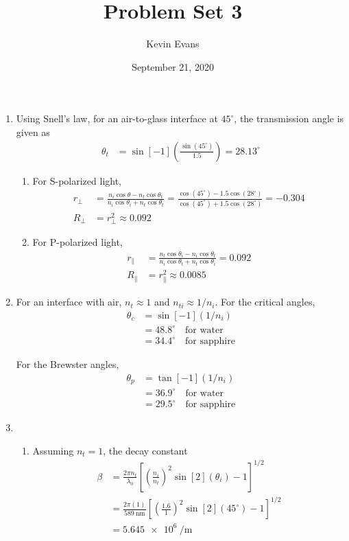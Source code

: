 \documentclass{homework}
\title{Problem Set 3}
\author{Kevin Evans}
\date{September 21, 2020}
\begin{document}
	\maketitle
	\begin{enumerate}
		\item Using Snell's law, for an air-to-glass interface at $45^\circ$, the transmission angle is given as \begin{align*}
			\theta_t & = \sin[-1](\frac{\sin(45^\circ)}{1.5}) = 28.13^\circ
		\end{align*} \begin{enumerate}
			\item For S-polarized light, \begin{align*}
				r_\perp & = \frac{n_i \cos \theta - n_t \cos \theta_t}{n_i \cos \theta_i + n_t \cos \theta_t} = \frac{\cos(45^\circ) - 1.5 \cos(28^\circ)}{\cos(45^\circ) + 1.5 \cos(28^\circ)} = -0.304 \\
				R_\perp & = r_\perp^2 \approx 0.092
			\end{align*}
			
			\item For P-polarized light, \begin{align*}
				r_\parallel & = \frac{n_t \cos \theta_i - n_i \cos \theta_t}{n_i \cos \theta_t + n_t \cos \theta_i} = 0.092 \\
				R_\parallel & = r_\parallel^2 \approx 0.0085
			\end{align*}
		\end{enumerate}
	
		\item For an interface with air, $n_t \approx 1$ and $n_{ti} \approx 1 / n_i$. For the critical angles, \begin{align*}
			\theta_c & = \sin[-1](1 / n_{i}) \\
					& = 48.8^\circ \quad \text{for water} \\
					& = 34.4^\circ \quad \text{for sapphire}
		\end{align*}
	
		For the Brewster angles,  \begin{align*}
			\theta_p & = \tan[-1](1 / n_i) \\
				& = 36.9^\circ \quad \text{for water}\\
				& = 29.5^\circ \quad \text{for sapphire}
		\end{align*}
	
		\item \begin{enumerate}
			\item Assuming $n_t = 1$, the decay constant \begin{align*}
				\beta & = \frac{2 \pi n_t}{\lambda_0} \left[\left(\frac{n_i}{n_t}\right)^2 \sin[2](\theta_i) - 1\right]^{1/2} \\
					& = \frac{2 \pi \left(1\right)}{\SI{589}{\nm}} \left[ \left(\frac{1.6}{1}\right)^2 \sin[2](45^\circ) - 1\right]^{1/2} \\
					& = \SI{5.645e6}{\per\m}
			\end{align*}
		

\end{enumerate}
\end{enumerate}
\end{document}
